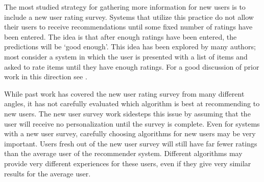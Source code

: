 \documentclass[letterpaper]{sig-alternate}
\begin{document}
 
  The most studied strategy for gathering more information for new users is to include a new user rating survey.
  Systems that utilize this practice do not allow their users to receive recommendations until some fixed number of ratings have been entered.
  The idea is that after enough ratings have been entered, the predictions will be `good enough'.
  This idea has been explored by many authors; most consider a system in which the user is presented with a list of items and asked to rate items until they have enough ratings.
  For a good discussion of prior work in this direction see \cite{adaptiveBootstrapping}.



  While past work has covered the new user rating survey from many different angles, it has not carefully evaluated which algorithm is best at recommending to new users.
  The new user survey work sidesteps this issue by assuming that the user will receive no personalization until the survey is complete.
  Even for systems with a new user survey, carefully choosing algorithms for new users may be very important.
  Users fresh out of the new user survey will still have far fewer ratings than the average user of the recommender system.
  Different algorithms may provide very different experiences for these users, even if they give very similar results for the average user.
  
\end{document}
